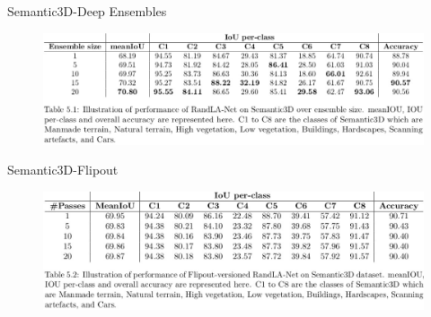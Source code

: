 \documentclass[aspectratio=169]{beamer}
\begin{document}
\begin{frame}[noframenumbering]{Semantic3D-Deep Ensembles}
    \begin{figure}
        \centering
        \includegraphics[scale=0.4]{images/Semantic3d_DE.jpg}
    \end{figure}
\end{frame}
\begin{frame}[noframenumbering]{Semantic3D-Flipout}
    \begin{figure}
        \centering
        \includegraphics[scale=0.4]{images/Semantic3d_Fout.jpg}
    \end{figure}
\end{frame}
\end{document}
